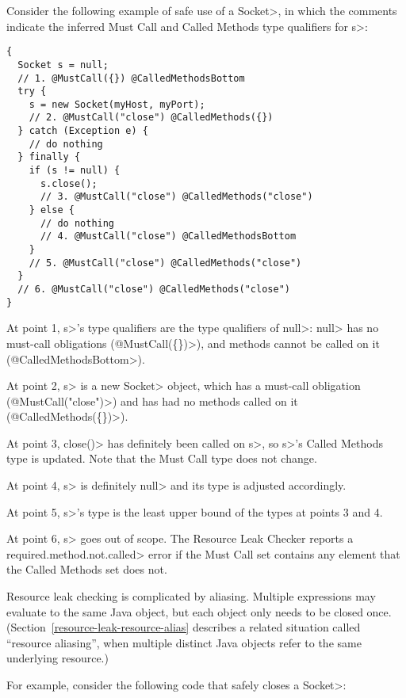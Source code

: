 
Consider the following example of safe use of a \<Socket>, in which the comments indicate the
inferred Must Call and Called Methods type qualifiers for \<s>:
\begin{verbatim}
{
  Socket s = null;
  // 1. @MustCall({}) @CalledMethodsBottom
  try {
    s = new Socket(myHost, myPort);
    // 2. @MustCall("close") @CalledMethods({})
  } catch (Exception e) {
    // do nothing
  } finally {
    if (s != null) {
      s.close();
      // 3. @MustCall("close") @CalledMethods("close")
    } else {
      // do nothing
      // 4. @MustCall("close") @CalledMethodsBottom
    }
    // 5. @MustCall("close") @CalledMethods("close")
  }
  // 6. @MustCall("close") @CalledMethods("close")
}
\end{verbatim}

At point 1, \<s>'s type qualifiers are the type qualifiers of \<null>:
\<null> has no must-call obligations (\<@MustCall(\{\})>),
and methods cannot be called on it (\<@CalledMethodsBottom>).

At point 2, \<s> is a new \<Socket> object, which
has a must-call obligation (\<@MustCall("close")>)
and has had no methods called on it (\<@CalledMethods(\{\})>).

At point 3, \<close()> has definitely been called on \<s>, so
\<s>'s Called Methods type is updated. Note that the Must Call type
does not change.

At point 4, \<s> is definitely \<null> and its type is adjusted accordingly.

At point 5, \<s>'s type is the least upper bound of the types at points 3
and 4.

At point 6, \<s> goes out of scope.  The Resource Leak Checker reports a
\<required.method.not.called> error if the Must Call set contains any
element that the Called Methods set does not.


Resource leak checking is complicated by aliasing.  Multiple expressions
may evaluate to the same Java object, but each object only needs to be
closed once.  (Section~\ref{resource-leak-resource-alias} describes a
related situation called ``resource aliasing'', when multiple distinct Java objects
refer to the same underlying resource.)

For example, consider the following code that safely closes a \<Socket>:

